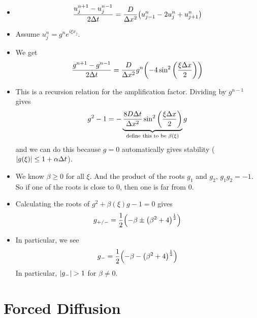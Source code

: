 \documentclass{article}
\newcommand{\Dx}{\Delta x}
\newcommand{\Dt}{\Delta t}
\begin{document}
        \begin{itemize}
            \item \begin{align*}
                \frac{u_j^{n+1} - u_j^{n-1}}{2\Dt} = \frac{D}{\Dx^2}\qty(u_{j-1}^n - 2u_j^n + u_{j+1}^n)
            \end{align*}
            \item Assume $u_j^n = g^ne^{i\xi x_j}$.
            \item We get
            \begin{align*}
                \frac{g^{n+1} - g^{n-1}}{2\Dt} = \frac{D}{\Dx^2}g^n\qty(-4\sin^2\qty(\frac{\xi\Dx}{2}))
            \end{align*}
            \item This is a recursion relation for the amplification factor.  Dividing by $g^{n-1}$ gives
            \begin{align*}
                g^2 - 1 = -\underbrace{\frac{8D\Dt}{\Dx^2}\sin^2\qty(\frac{\xi\Dx}{2})}_\text{define this to be $\beta(\xi)$}g
            \end{align*}
            and we can do this because $g = 0$ automatically gives stability ($\abs{g(\xi)} \leq 1 + \alpha\Dt$).
            \item We know $\beta \geq 0$ for all $\xi$.  And the product of the roots $g_1$ and $g_2$, $g_1g_2 = -1$.  So if one of the roots is close to $0$, then one is far from $0$.
            \item Calculating the roots of $g^2 + \beta(\xi)g - 1 = 0$ gives
            \begin{align*}
                g_{+/-} = \frac{1}{2} \qty(-\beta \pm\qty(\beta^2 + 4)^\frac{1}{2})
            \end{align*}
            \item In particular, we see
            \begin{align*}
                g_- = \frac{1}{2}\qty(-\beta - \qty(\beta^2 + 4)^\frac{1}{2})
            \end{align*}
            In particular, $\abs{g_-} > 1$ for $\beta \neq 0$.
        \end{itemize}

    \section{Forced Diffusion}
\end{document}
